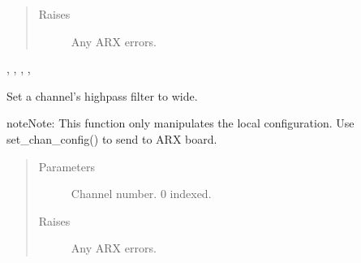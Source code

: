 \documentclass[letterpaper,10pt,english]{sphinxmanual}
\begin{document}
\begin{fulllineitems}
\begin{fulllineitems}
\begin{quote}
\begin{description}
\item[{Raises}] \leavevmode
{} \textendash{} Any ARX errors.

\end{description}\end{quote}




{\hyperref[\detokenize{index:lwautils.lwa_arx.ARX.show_chan_cfg}]{}}, {\hyperref[\detokenize{index:lwautils.lwa_arx.ARX.set_chan_cfg}]{}}, {\hyperref[\detokenize{index:lwautils.lwa_arx.ARX.set_chan_cfg_lowpass_narrow}]{}}, {\hyperref[\detokenize{index:lwautils.lwa_arx.ARX.set_chan_cfg_lowpass_wide}]{}}, {\hyperref[\detokenize{index:lwautils.lwa_arx.ARX.set_chan_cfg_highpass_wide}]{}}



\end{fulllineitems}


\begin{fulllineitems}
\label{\detokenize{index:lwautils.lwa_arx.ARX.set_chan_cfg_highpass_wide}}
Set a channel’s highpass filter to wide.

\begin{sphinxadmonition}{note}{Note:}
This function only manipulates the local configuration.
Use set\_chan\_config() to send to ARX board.
\end{sphinxadmonition}
\begin{quote}\begin{description}
\item[{Parameters}] \leavevmode
{} \textendash{} Channel number. 0 indexed.

\item[{Raises}] \leavevmode
{} \textendash{} Any ARX errors.


\end{description}
\end{quote}
\end{fulllineitems}
\end{fulllineitems}
\end{document}
